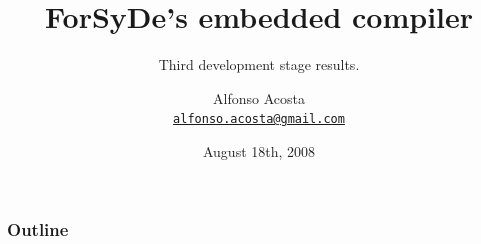 \documentclass{beamer}
\title%
{ForSyDe's embedded compiler}
\subtitle{Third development stage results.}
\author[A.Acosta] %
{Alfonso Acosta\\
\footnotesize \href{mailto:alfonso.acosta@gmail.com}{\nolinkurl{alfonso.acosta@gmail.com}}}
\institute[KTH] %
{ICT/ECS\\Royal Institute of Technology, Stockholm}
\date%
{August 18th, 2008}
\begin{document}
\begin{frame}
  \titlepage
\end{frame}

\begin{frame}
  \frametitle{Outline}
  \tableofcontents[pausesections]
\end{frame}





\beamerdefaultoverlayspecification{}
\end{document}
